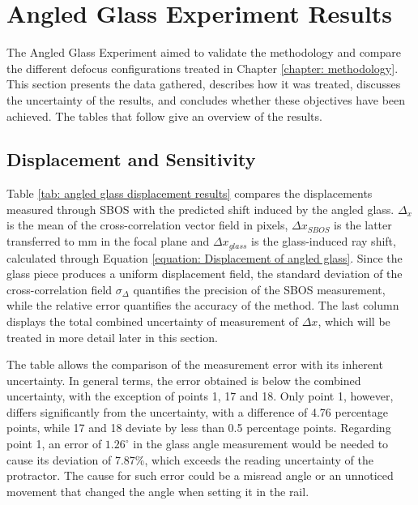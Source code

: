 \section{Angled Glass Experiment Results}
\label{section: Angled Glass Experiment Results}
The Angled Glass Experiment aimed to validate the methodology and compare the different defocus configurations treated in Chapter \ref{chapter: methodology}. This section presents the data gathered, describes how it was treated, discusses the uncertainty of the results, and concludes whether these objectives have been achieved. The tables that follow give an overview of the results.

\subsection{Displacement and Sensitivity}
\label{subsection: Angled Glass Displacement and Sensitivity}

Table \ref{tab: angled glass displacement results} compares the displacements measured through SBOS with the predicted shift induced by the angled glass. $\Delta_x$ is the mean of the cross-correlation vector field in pixels, $\Delta x_{SBOS}$ is the latter transferred to mm in the focal plane and $\Delta x_{glass}$ is the glass-induced ray shift, calculated through Equation \ref{equation: Displacement of angled glass}. Since the glass piece produces a uniform displacement field, the standard deviation of the cross-correlation field $\sigma_\Delta$ quantifies the precision of the SBOS measurement, while the relative error quantifies the accuracy of the method. The last column displays the total combined uncertainty of measurement of $\Delta x$, which will be treated in more detail later in this section.

The table allows the comparison of the measurement error with its inherent uncertainty. In general terms, the error obtained is below the combined uncertainty, with the exception of points 1, 17 and 18. Only point 1, however, differs significantly from the uncertainty, with a difference of 4.76 percentage points, while 17 and 18 deviate by less than 0.5 percentage points. Regarding point 1, an error of $1.26^{\circ}$ in the glass angle measurement would be needed to cause its deviation of 7.87\%, which exceeds the reading uncertainty of the protractor. The cause for such error could be a misread angle or an unnoticed movement that changed the angle when setting it in the rail.

